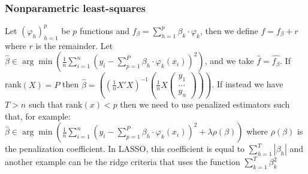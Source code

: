 \documentclass{article}
\begin{document}
\subsubsection{Nonparametric least-squares}
Let \((\varphi_h)_{h=1}^{p}\) be $p$ functions and \(f_\beta=\sum_{h=1}^{p}\beta_k \cdot \varphi_k\), then we define \(f=f_\beta+ r\) where $r$ is the remainder. Let \(\hat{\beta}\in \arg\min \left(\frac{1}{n}\sum_{i=1}^{n}\left(y_i-\sum_{p=1}^{P}\beta_h\cdot \varphi_k(x_i)\right)^{2}\right) \), and we take \(\hat{f}=\hat{f_\beta}\). If rank$(X)=P$ then \(\hat{\beta}=\left((\frac{1}{n}X'X)^{-1}\left(\frac{1}{n}X\left(\begin{array}{c}
    y_1 \\
    \dots \\
    y_n
    
\end{array}\right)\right)\right)\). If instead we have $T>n$ such that $\text{rank}(x)<p$ then we need to use penalized estimators such that, for example: \(\hat{\beta}\in \arg\min \left(\frac{1}{n}\sum_{i=1}^{n}\left(y_i-\sum_{p=1}^{P}\beta_h\cdot \varphi_k(x_i)\right)^{2}+ \lambda \rho(\beta)\right) \) where $\rho(\beta)$ is the penalization coefficient. In LASSO, this coefficient is equal to \(\sum_{h=1}^{T}|\beta_h|\) and another example can be the ridge criteria that uses the function \(\sum_{k=1}^{T}\beta_k^{2}\)
\end{document}
